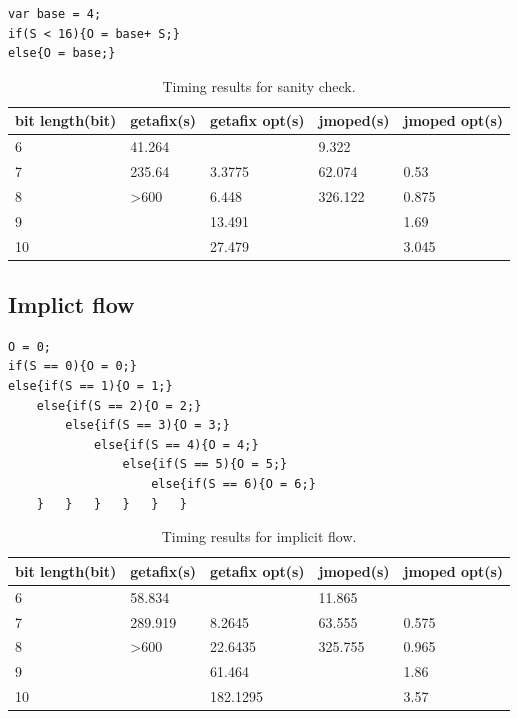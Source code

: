 \lstset{language=C}  
\begin{lstlisting}[caption={Sanity check test program.},label=lst:sanity]
var base = 4;
if(S < 16){O = base+ S;}
else{O = base;}
\end{lstlisting}

\begin{table}[htbp]
\begin{tabular}{|l|l|l|l|l|}
\hline
bit length(bit) & getafix(s) & getafix opt(s) & jmoped(s) & jmoped opt(s) \\ \hline
6 & 41.264 & {} & 9.322 & {} \\ \hline
7 & 235.64 & 3.3775 & {62.074} & 0.53 \\ \hline
8 & \textgreater 600 & 6.448 & {326.122} & 0.875 \\ \hline
9 &  & 13.491 &  & 1.69 \\ \hline
10 &  & 27.479 &  & 3.045 \\ \hline
\end{tabular}
\caption{Timing results for sanity check.}
\label{tbl:sanity}
\end{table}

\subsection{Implict flow}

\lstset{language=C}  
\begin{lstlisting}[caption={Implict flow test program.},label=lst:implicit]
O = 0;
if(S == 0){O = 0;}
else{if(S == 1){O = 1;}
	else{if(S == 2){O = 2;}
		else{if(S == 3){O = 3;}
			else{if(S == 4){O = 4;}
				else{if(S == 5){O = 5;}
					else{if(S == 6){O = 6;}
	}	}	}	}	}	}
\end{lstlisting}

\begin{table}[htbp]
\begin{tabular}{|l|l|l|l|l|}
\hline
{bit length(bit)} & getafix(s) & {getafix opt(s)} & jmoped(s) & {jmoped opt(s)} \\ \hline
6 & {58.834} & {} & {11.865} & {} \\ \hline
7 & {289.919} & 8.2645 & {63.555} & 0.575 \\ \hline
8 & \textgreater 600 & 22.6435 & {325.755} & 0.965 \\ \hline
9 &  & 61.464 &  & 1.86 \\ \hline
10 &  & 182.1295 &  & 3.57 \\ \hline
\end{tabular}
\caption{Timing results for implicit flow.}
\label{tbl:implicit}
\end{table}

